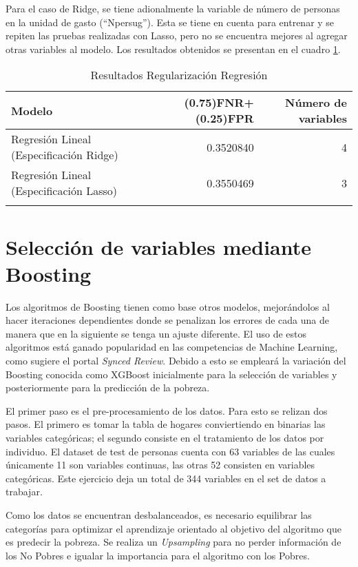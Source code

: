 \documentclass[11pt,a4paper]{article}
\begin{document}
Para el caso de Ridge, se tiene adionalmente la variable de número de personas en la unidad de gasto (``Npersug''). Esta se tiene en cuenta para entrenar y se repiten las pruebas realizadas con Lasso, pero no se encuentra mejores al agregar otras variables al modelo. Los resultados obtenidos se presentan en el cuadro \ref{ridge-lasso}.



\begin{table}[H]
\centering
\caption{Resultados Regularización Regresión}
\begin{tabular}{lrr}
\toprule
Modelo & (0.75)FNR+(0.25)FPR & Número de variables\\
\midrule
Regresión Lineal (Especificación Ridge) & 0.3520840 & 4\\
Regresión Lineal (Especificación Lasso) & 0.3550469 & 3\\
\bottomrule
\label{ridge-lasso}
\end{tabular}
\end{table}


\section{Selección de variables mediante Boosting }

Los algoritmos de Boosting tienen como base otros modelos, mejorándolos al hacer iteraciones dependientes donde se penalizan los errores de cada una de manera que en la siguiente se tenga un ajuste diferente. El uso de estos algoritmos está ganado popularidad en las competencias de Machine Learning, como sugiere el portal \emph{Synced Review}. Debido a esto se empleará la variación del Boosting conocida como XGBoost inicialmente para la selección de variables y posteriormente para la predicción de la pobreza.

El primer paso es el pre-procesamiento de los datos. Para esto se relizan dos pasos. El primero es tomar la tabla de hogares conviertiendo en binarias las variables categóricas; el segundo consiste en el tratamiento de los datos por individuo. El dataset de test de personas cuenta con 63 variables de las cuales únicamente 11 son variables continuas, las otras 52 consisten en variables categóricas. Este ejercicio deja un total de 344 variables en el set de datos a trabajar.

Como los datos se encuentran desbalanceados, es necesario equilibrar las categorías para optimizar el aprendizaje orientado al objetivo del algoritmo que es predecir la pobreza. Se realiza un \emph{Upsampling} para no perder información de los No Pobres e igualar la importancia para el algoritmo con los Pobres.
\end{document}
